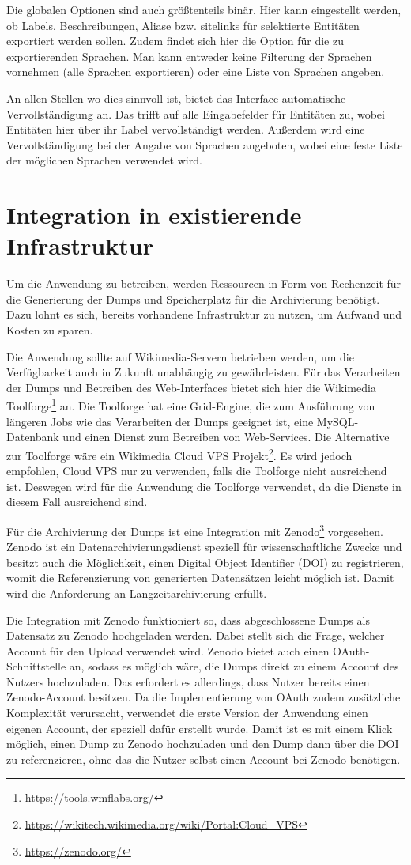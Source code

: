 Die globalen Optionen sind auch größtenteils binär.
Hier kann eingestellt werden, ob Labels, Beschreibungen, Aliase bzw. sitelinks für selektierte Entitäten exportiert werden sollen.
Zudem findet sich hier die Option für die zu exportierenden Sprachen.
Man kann entweder keine Filterung der Sprachen vornehmen (alle Sprachen exportieren) oder eine Liste von Sprachen angeben.

An allen Stellen wo dies sinnvoll ist, bietet das Interface automatische Vervollständigung an.
Das trifft auf alle Eingabefelder für Entitäten zu, wobei Entitäten hier über ihr Label vervollständigt werden.
Außerdem wird eine Vervollständigung bei der Angabe von Sprachen angeboten, wobei eine feste Liste der möglichen Sprachen verwendet wird.

\section{Integration in existierende Infrastruktur}
Um die Anwendung zu betreiben, werden Ressourcen in Form von Rechenzeit für die Generierung der Dumps und Speicherplatz für die Archivierung benötigt.
Dazu lohnt es sich, bereits vorhandene Infrastruktur zu nutzen, um Aufwand und Kosten zu sparen.

Die Anwendung sollte auf Wikimedia-Servern betrieben werden, um die Verfügbarkeit auch in Zukunft unabhängig zu gewährleisten.
Für das Verarbeiten der Dumps und Betreiben des Web-Interfaces bietet sich hier die Wikimedia Toolforge\footnote{\url{https://tools.wmflabs.org/}} an.
Die Toolforge hat eine Grid-Engine, die zum Ausführung von längeren Jobs wie das Verarbeiten der Dumps geeignet ist, eine MySQL-Datenbank und einen Dienst zum Betreiben von Web-Services.
Die Alternative zur Toolforge wäre ein Wikimedia Cloud VPS Projekt\footnote{\url{https://wikitech.wikimedia.org/wiki/Portal:Cloud_VPS}}.
Es wird jedoch empfohlen, Cloud VPS nur zu verwenden, falls die Toolforge nicht ausreichend ist.
Deswegen wird für die Anwendung die Toolforge verwendet, da die Dienste in diesem Fall ausreichend sind.

Für die Archivierung der Dumps ist eine Integration mit Zenodo\footnote{\url{https://zenodo.org/}} vorgesehen.
Zenodo ist ein Datenarchivierungsdienst speziell für wissenschaftliche Zwecke und besitzt auch die Möglichkeit, einen Digital Object Identifier (DOI) zu registrieren, womit die Referenzierung von generierten Datensätzen leicht möglich ist.
Damit wird die Anforderung an Langzeitarchivierung erfüllt. 

Die Integration mit Zenodo funktioniert so, dass abgeschlossene Dumps als Datensatz zu Zenodo hochgeladen werden.
Dabei stellt sich die Frage, welcher Account für den Upload verwendet wird.
Zenodo bietet auch einen OAuth-Schnittstelle an, sodass es möglich wäre, die Dumps direkt zu einem Account des Nutzers hochzuladen.
Das erfordert es allerdings, dass Nutzer bereits einen Zenodo-Account besitzen.
Da die Implementierung von OAuth zudem zusätzliche Komplexität verursacht, verwendet die erste Version der Anwendung einen eigenen Account, der speziell dafür erstellt wurde.
Damit ist es mit einem Klick möglich, einen Dump zu Zenodo hochzuladen und den Dump dann über die DOI zu referenzieren, ohne das die Nutzer selbst einen Account bei Zenodo benötigen.